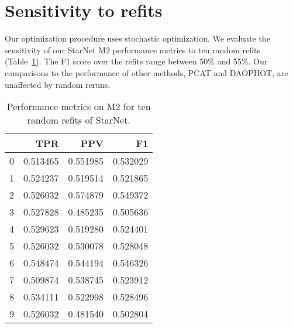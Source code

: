 \section{Sensitivity to refits}
\label{sec:refits}

Our optimization procedure uses stochastic optimization. 
We evaluate the sensitivity of our StarNet M2 performance metrics to ten random refits (Table~\ref{tab:refits}). 
The F1 score over the refits range
between 50\% and 55\%. Our comparisons 
to the performance of other methods, PCAT and DAOPHOT, 
are unaffected by random reruns. 

\begin{table}
\centering
\caption{Performance metrics on M2 for ten random refits of StarNet. }
\vspace{0.2em}
\label{tab:refits}
\begin{tabular}{lrrr}
\toprule
 &       TPR &       PPV &        F1 \\
\midrule
0 &  0.513465 &  0.551985 &  0.532029 \\
1 &  0.524237 &  0.519514 &  0.521865 \\
2 &  0.526032 &  0.574879 &  0.549372 \\
3 &  0.527828 &  0.485235 &  0.505636 \\
4 &  0.529623 &  0.519280 &  0.524401 \\
5 &  0.526032 &  0.530078 &  0.528048 \\
6 &  0.548474 &  0.544194 &  0.546326 \\
 7 &  0.509874 &  0.538745 &  0.523912 \\
8 &  0.534111 &  0.522998 &  0.528496 \\
9 &  0.526032 &  0.481540 &  0.502804 \\
\bottomrule
\end{tabular}
\end{table}
